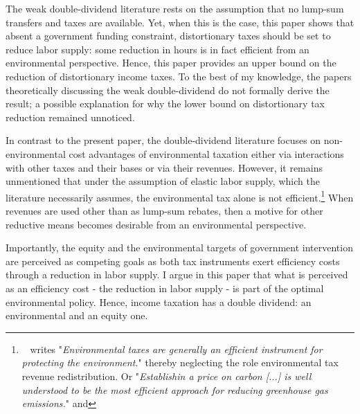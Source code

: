The weak double-dividend literature rests on the assumption that no lump-sum transfers and taxes are available. Yet, when this is the case, this paper shows that absent a government funding constraint, distortionary taxes should be set to reduce labor supply: some reduction in hours is in fact efficient from an environmental perspective. Hence, this paper provides an upper bound on the reduction of distortionary income taxes. To the best of my knowledge, the papers theoretically discussing the weak double-dividend \citep{LansBovenberg1996OptimalAnalyses, Goulder1995EnvironmentalGuide} do not formally derive the result; a possible explanation for why the lower bound on distortionary tax reduction remained unnoticed. 

In contrast to the present paper, the double-dividend literature focuses on non-environmental cost advantages of environmental taxation either via interactions with other taxes and their bases or via their revenues. However, it remains unmentioned that under the assumption of elastic labor supply, which the literature necessarily assumes, the environmental tax alone is not efficient.\footnote{\ \cite{LansBovenberg1999GreenGuide} writes "\textit{Environmental taxes are  generally  an  efficient  instrument  for  protecting  the  environment.}" thereby neglecting the role environmental tax revenue redistribution. Or "\textit{Establishin a price on carbon [...] is well understood to be the most efficient approach for reducing greenhouse gas emissions.}" \citep{Fried2018TheGenerations} and } When revenues are used other than as lump-sum rebates, then a motive for other reductive means becomes desirable from an environmental perspective. 

Importantly, the equity and the environmental targets of government intervention are perceived as competing goals as both tax instruments exert efficiency costs through a reduction in labor supply.
I argue in this paper that what is perceived as an efficiency cost -  the reduction in labor supply - is part of the optimal environmental policy. Hence, income taxation has a double dividend: an environmental and an equity one.  

